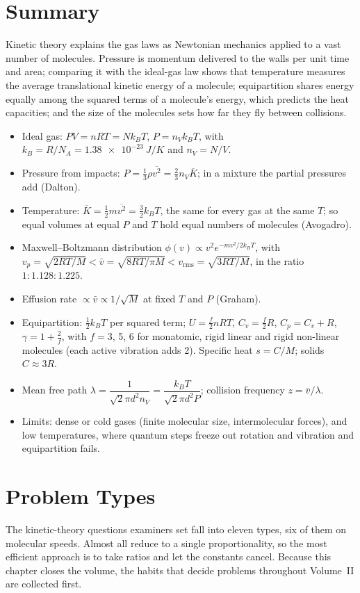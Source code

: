 \section{Summary}\label{sec:ktsummary}
Kinetic theory explains the gas laws as Newtonian mechanics applied to a vast number of molecules.
Pressure is momentum delivered to the walls per unit time and area; comparing it with the ideal-gas law
shows that temperature measures the average translational kinetic energy of a molecule; equipartition
shares energy equally among the squared terms of a molecule's energy, which predicts the heat capacities;
and the size of the molecules sets how far they fly between collisions.

\begin{itemize}
\item Ideal gas: $PV=nRT=Nk_BT$, $P=n_Vk_BT$, with $k_B=R/N_A=\SI{1.38e-23}{J/K}$ and
      $n_V=N/V$.
\item Pressure from impacts: $P=\tfrac13\rho\overline{v^2}=\tfrac23n_V\overline K$; in a mixture the
      partial pressures add (Dalton).
\item Temperature: $\overline K=\tfrac12m\overline{v^2}=\tfrac32k_BT$, the same for every gas at the same
      $T$; so equal volumes at equal $P$ and $T$ hold equal numbers of molecules (Avogadro).
\item Maxwell--Boltzmann distribution $\phi(v)\propto v^2e^{-mv^2/2k_BT}$, with
      $v_p=\sqrt{2RT/M}<\bar v=\sqrt{8RT/\pi M}<v_{\text{rms}}=\sqrt{3RT/M}$, in the ratio
      $1:1.128:1.225$.
\item Effusion rate $\propto\bar v\propto1/\sqrt M$ at fixed $T$ and $P$ (Graham).
\item Equipartition: $\tfrac12k_BT$ per squared term; $U=\tfrac f2nRT$, $C_v=\tfrac f2R$,
      $C_p=C_v+R$, $\gamma=1+\tfrac2f$, with $f=3$, 5, 6 for monatomic, rigid linear and rigid non-linear
      molecules (each active vibration adds 2). Specific heat $s=C/M$; solids $C\approx3R$.
\item Mean free path $\lambda=\dfrac{1}{\sqrt2\pi d^2n_V}=\dfrac{k_BT}{\sqrt2\pi d^2P}$; collision
      frequency $z=\bar v/\lambda$.
\item Limits: dense or cold gases (finite molecular size, intermolecular forces), and low temperatures,
      where quantum steps freeze out rotation and vibration and equipartition fails.
\end{itemize}

\section{Problem Types}\label{sec:kttypes}
The kinetic-theory questions examiners set fall into eleven types, six of them on molecular speeds. Almost
all reduce to a single proportionality, so the most efficient approach is to take ratios and let the
constants cancel. Because this chapter closes the volume, the habits that decide problems throughout
Volume~II are collected first.

